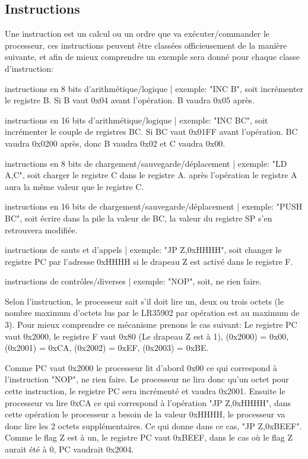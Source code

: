 \documentclass{report}
\begin{document}
\subsection{Instructions}
Une instruction est un calcul ou un ordre que va exécuter/commander le processeur, ces instructions peuvent être classées officieusement de la manière suivante, et afin de mieux comprendre un exemple sera donné pour chaque classe d'instruction:

instructions en 8 bits d'arithmétique/logique | exemple: "INC B", soit incrémenter le registre B. Si B vaut 0x04 avant l'opération. B vaudra 0x05 après.

instructions en 16 bits d'arithmétique/logique | exemple: "INC BC", soit incrémenter le couple de registres BC. Si BC vaut 0x01FF avant l'opération. BC vaudra 0x0200 après, donc B vaudra 0x02 et C vaudra 0x00.

instructions en 8 bits de chargement/sauvegarde/déplacement | exemple: "LD A,C", soit charger le registre C dans le registre A. après l'opération le registre A aura la même valeur que le registre C.

instructions en 16 bits de chargement/sauvegarde/déplacement | exemple: "PUSH BC", soit écrire dans la pile la valeur de BC, la valeur du registre SP s'en retrouvera modifiée.

instructions de sauts et d'appels | exemple: "JP Z,0xHHHH", soit changer le registre PC par l'adresse 0xHHHH si le drapeau Z est activé dans le registre F.

instructions de contrôles/diverses | exemple: "NOP", soit, ne rien faire.

Selon l'instruction, le processeur sait s'il doit lire un, deux ou trois octets (le nombre maximum d'octets lus par le LR35902 par opération est au maximum de 3). Pour mieux comprendre ce mécanisme prenons le cas suivant: 
Le registre PC vaut 0x2000, le registre F vaut 0x80 (Le drapeau Z est à 1), (0x2000) = 0x00, (0x2001) = 0xCA, (0x2002) = 0xEF, (0x2003) = 0xBE.

Comme PC vaut 0x2000 le processeur lit d'abord 0x00 ce qui correspond à l'instruction "NOP", ne rien faire. 
Le processeur ne lira donc qu'un octet pour cette instruction, le registre PC sera incrémenté et vaudra 0x2001.
Ensuite le processeur va lire 0xCA ce qui correspond à l'opération "JP Z,0xHHHH", dans cette opération le processeur a besoin de la valeur 0xHHHH, le processeur va donc lire les 2 octets supplémentaires. Ce qui donne dans ce cas, "JP Z,0xBEEF".
Comme le flag Z est à un, le registre PC vaut 0xBEEF, dans le cas où le flag Z aurait été à 0, PC vaudrait 0x2004.
\end{document}
